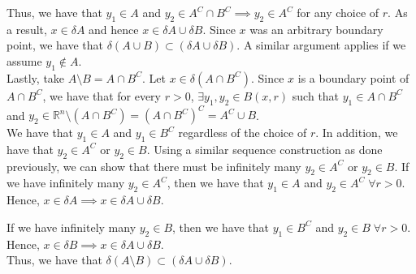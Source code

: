\documentclass[12pt]{article}
\begin{document}
Thus, we have that $y_1 \in A$ and $y_2 \in A^C \cap B^C \implies y_2 \in A^C$ for any choice of $r$. As a result, $x \in \delta A$ and hence $x \in \delta A \cup \delta B$. Since $x$ was an arbitrary boundary point, we have that $\delta(A \cup B) \subset (\delta A \cup \delta B)$. A similar argument applies if we assume $y_1 \not\in A$.\\

Lastly, take $A \setminus B = A \cap B^C$. Let $x \in \delta(A \cap B^C)$. Since $x$ is a boundary point of $A \cap B^C$, we have that for every $r > 0$, $\exists y_1, y_2 \in B(x, r)$ such that $y_1 \in A \cap B^C$ and $y_2 \in \mathbb{R}^n \setminus (A \cap B^C) = (A \cap B^C)^C = A^C \cup B$.\\

We have that $y_1 \in A$ and $y_1 \in B^C$ regardless of the choice of $r$. In addition, we have that $y_2 \in A^C$ or $y_2 \in B$. Using a similar sequence construction as done previously, we can show that there must be infinitely many $y_2 \in A^C$ or $y_2 \in B$. If we have infinitely many $y_2 \in A^C$, then we have that $y_1 \in A$ and $y_2 \in A^C \; \forall r > 0$. Hence, $x \in \delta A \implies x \in \delta A \cup \delta B$.

If we have infinitely many $y_2 \in B$, then we have that $y_1 \in B^C$ and $y_2 \in B \; \forall r > 0$. Hence, $x \in \delta B \implies x \in \delta A \cup \delta B$.\\

Thus, we have that $\delta(A \setminus B) \subset (\delta A \cup \delta B)$.
\end{document}
